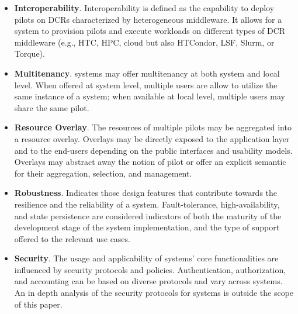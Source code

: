 \documentclass{sig-alternate}
\begin{document}
\begin{itemize}
\item \textbf{Interoperability}. Interoperability is defined as the capability
  to deploy pilots on DCRs characterized by heterogeneous middleware. It allows
  for a \pilot system to provision pilots and execute workloads on different
  types of DCR middleware (e.g., HTC, HPC, cloud but also HTCondor, LSF, Slurm, or
  Torque).

\item \textbf{Multitenancy}. \pilot systems may offer multitenancy at both
  system and local level. When offered at system level, multiple users are allow
  to utilize the same instance of a \pilot system; when available at local
  level, multiple users may share the same pilot.

\item \textbf{Resource Overlay}. The resources of multiple pilots may be
  aggregated into a resource overlay. Overlays may be directly exposed to the
  application layer and to the end-users depending on the public interfaces and
  usability models. Overlays may abstract away the notion of pilot or offer an
  explicit semantic for their aggregation, selection, and management.

\item \textbf{Robustness}. Indicates those design features that contribute
  towards the resilience and the reliability of a \pilot system.
  Fault-tolerance, high-availability, and state persistence are considered
  indicators of both the maturity of the development stage of the \pilot system
  implementation, and the type of support offered to the relevant use cases.


\item \textbf{Security}. The usage and applicability of \pilot systems' core
  functionalities are influenced by security protocols and policies.
  Authentication, authorization, and accounting can be based on diverse
  protocols and vary across \pilot systems. An in depth analysis of the security
  protocols for \pilot systems is outside the scope of this paper.


\end{itemize}
\end{document}
